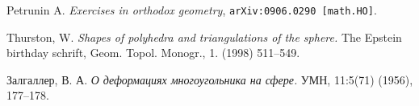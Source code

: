 \documentclass[oneside,a4paper]{article}
\begin{document}
\begin{thebibliography}{52}
Petrunin A.
\emph{Exercises in orthodox geometry},
{\tt arXiv:0906.0290 [math.HO]}.

Thurston, W. 
\textit{Shapes of polyhedra and triangulations of the sphere.} 
The Epstein birthday schrift,  Geom. Topol. Monogr., 1. (1998) 511--549.

\begin{otherlanguage}{russian}
Залгаллер, В. А.
\textit{О деформациях многоугольника на сфере.}
УМН, 11:5(71) (1956),  177--178.
\end{otherlanguage}
\end{thebibliography}
\end{document}
